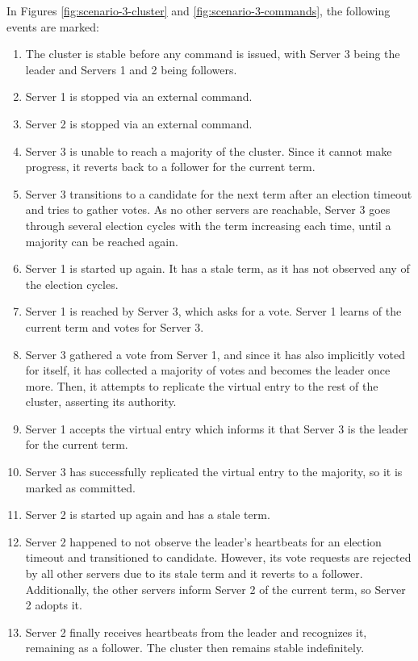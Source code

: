 In Figures \ref{fig:scenario-3-cluster} and \ref{fig:scenario-3-commands}, the following events are marked:
\begin{enumerate}
    \item The cluster is stable before any command is issued, with Server 3 being the leader and Servers 1 and 2 being followers.
    \item Server 1 is stopped via an external command.
    \item Server 2 is stopped via an external command.
    \item Server 3 is unable to reach a majority of the cluster. Since it cannot make progress, it reverts back to a follower for the current term.
    \item Server 3 transitions to a candidate for the next term after an election timeout and tries to gather votes. As no other servers are reachable, Server 3 goes through several election cycles with the term increasing each time, until a majority can be reached again.
    \item Server 1 is started up again. It has a stale term, as it has not observed any of the election cycles.
    \item Server 1 is reached by Server 3, which asks for a vote. Server 1 learns of the current term and votes for Server 3.
    \item Server 3 gathered a vote from Server 1, and since it has also implicitly voted for itself, it has collected a majority of votes and becomes the leader once more. Then, it attempts to replicate the virtual entry to the rest of the cluster, asserting its authority.
    \item Server 1 accepts the virtual entry which informs it that Server 3 is the leader for the current term.
    \item Server 3 has successfully replicated the virtual entry to the majority, so it is marked as committed.
    \item Server 2 is started up again and has a stale term.
    \item Server 2 happened to not observe the leader's heartbeats for an election timeout and transitioned to candidate. However, its vote requests are rejected by all other servers due to its stale term and it reverts to a follower. Additionally, the other servers inform Server 2 of the current term, so Server 2 adopts it.
    \item Server 2 finally receives heartbeats from the leader and recognizes it, remaining as a follower. The cluster then remains stable indefinitely.
\end{enumerate}

